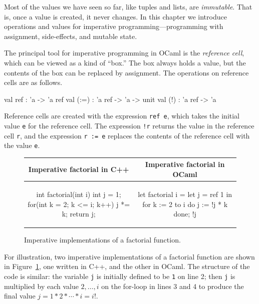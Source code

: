 %
%
%

Most of the values we have seen so far, like tuples and lists, are \emph{immutable}.  That is, once
a value is created, it never changes.  In this chapter we introduce operations and values for
imperative programming---programming with assignment, side-effects, and mutable state.

\label{keyword::=}
The principal tool for imperative programming in OCaml is the \emph{reference cell}, which can be
viewed as a kind of ``box.''  The box always holds a value, but the contents of the box can be
replaced by assignment.  The operations on reference cells are as follows.

\begin{ocaml}
val ref  : 'a -> 'a ref
val (:=) : 'a ref -> 'a -> unit
val (!)  : 'a ref -> 'a
\end{ocaml}
%
Reference cells are created with the expression \hbox{\lstinline/ref e/}, which takes the initial
value \hbox{\lstinline/e/} for the reference cell.  The expression \hbox{\lstinline/!r/} returns the value in the
reference cell \hbox{\lstinline/r/}, and the expression \hbox{\lstinline/r := e/} replaces the contents of the
reference cell with the value \hbox{\lstinline/e/}.

\begin{figure}[t]
\begin{center}
\begin{tabular}{c|c}
Imperative factorial in C++ & Imperative factorial in OCaml\\
\hline\hline
\begin{clisting}
int factorial(int i) {
    int j = 1;
    for(int k = 2; k <= i; k++)
        j *= k;
    return j;
}
\end{clisting}
&
{\lstset{numbers=left,numberstyle=\tiny,firstnumber=1,stepnumber=1}
\begin{ocamllisting}
let factorial i =
    let j = ref 1 in
    for k := 2 to i do
       j := !j * k
    done;
    !j
\end{ocamllisting}}
\end{tabular}
\end{center}
\caption{Imperative implementations of a factorial function.}
\label{figure:imp-fact}
\end{figure}

For illustration, two imperative implementations of a factorial function are shown in
Figure~\ref{figure:imp-fact}, one written in C++, and the other in OCaml.  The structure of the code
is similar: the variable \hbox{\lstinline/j/} is initially defined to be \hbox{\lstinline/1/} on line 2;
then \hbox{\lstinline/j/} is multiplied by each value $2, \ldots, i$ on the for-loop in lines 3 and
4 to produce the final value $j = 1 * 2 * \cdots * i = i!$.


